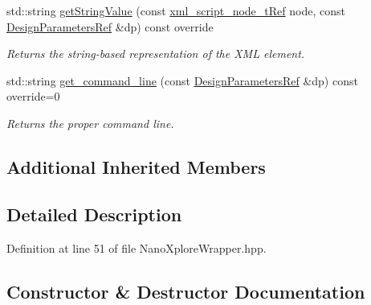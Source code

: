 \begin{DoxyCompactItemize}
std\+::string \hyperlink{classNanoXploreWrapper_a88615cca1531c82e07e1ed0d4cc9a47e}{get\+String\+Value} (const \hyperlink{xml__script__command_8hpp_a1fe3d50ade66bc35e41be9b68bbbcd02}{xml\+\_\+script\+\_\+node\+\_\+t\+Ref} node, const \hyperlink{DesignParameters_8hpp_ae36bb1c4c9150d0eeecfe1f96f42d157}{Design\+Parameters\+Ref} \&dp) const override
\begin{DoxyCompactList}\small\item\em Returns the string-\/based representation of the X\+ML element. \end{DoxyCompactList}\item 
std\+::string \hyperlink{classNanoXploreWrapper_a9aa78eed555faf8bc6970e05f7f8497c}{get\+\_\+command\+\_\+line} (const \hyperlink{DesignParameters_8hpp_ae36bb1c4c9150d0eeecfe1f96f42d157}{Design\+Parameters\+Ref} \&dp) const override=0
\begin{DoxyCompactList}\small\item\em Returns the proper command line. \end{DoxyCompactList}\end{DoxyCompactItemize}
\subsection*{Additional Inherited Members}


\subsection{Detailed Description}


Definition at line 51 of file Nano\+Xplore\+Wrapper.\+hpp.



\subsection{Constructor \& Destructor Documentation}
\mbox{\label{classNanoXploreWrapper_a0304c7e4f176fa98ad82feca482bd500}} 
